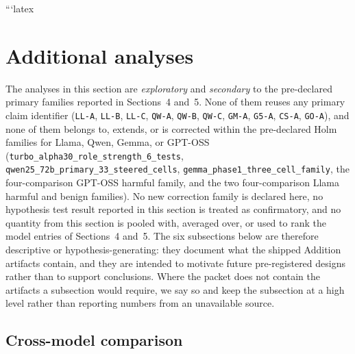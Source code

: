 ```latex
\section{Additional analyses}

The analyses in this section are \emph{exploratory} and \emph{secondary} to the
pre-declared primary families reported in Sections~4 and~5. None of them reuses
any primary claim identifier (\texttt{LL-A}, \texttt{LL-B}, \texttt{LL-C},
\texttt{QW-A}, \texttt{QW-B}, \texttt{QW-C}, \texttt{GM-A}, \texttt{G5-A},
\texttt{CS-A}, \texttt{GO-A}), and none of them belongs to, extends, or is
corrected within the pre-declared Holm families for Llama, Qwen, Gemma, or
GPT-OSS (\texttt{turbo\_alpha30\_role\_strength\_6\_tests},
\texttt{qwen25\_72b\_primary\_33\_steered\_cells},
\texttt{gemma\_phase1\_three\_cell\_family}, the four-comparison GPT-OSS harmful
family, and the two four-comparison Llama harmful and benign families). No new
correction family is declared here, no hypothesis test result reported in this
section is treated as confirmatory, and no quantity from this section is pooled
with, averaged over, or used to rank the model entries of Sections~4 and~5. The
six subsections below are therefore descriptive or hypothesis-generating: they
document what the shipped Addition artifacts contain, and they are intended to
motivate future pre-registered designs rather than to support conclusions.
Where the packet does not contain the artifacts a subsection would require, we
say so and keep the subsection at a high level rather than reporting numbers
from an unavailable source.

\subsection{Cross-model comparison}

